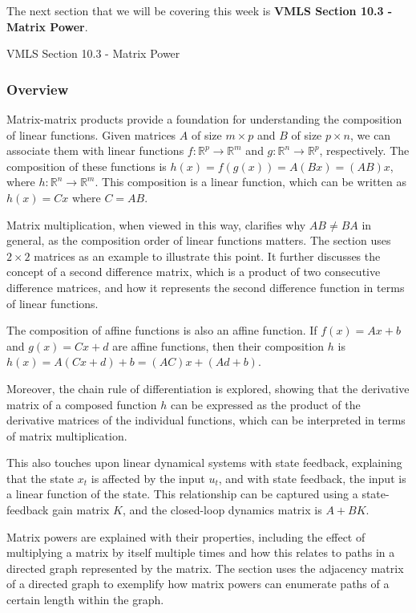 The next section that we will be covering this week is \textbf{VMLS Section 10.3 - Matrix Power}.

\begin{notes}{VMLS Section 10.3 - Matrix Power}
    \subsubsection*{Overview}

    Matrix-matrix products provide a foundation for understanding the composition of linear functions. Given matrices $A$ of size $m \times p$ and $B$ of size $p \times n$, we can associate them 
    with linear functions $f: \mathbb{R}^p \to \mathbb{R}^m$ and $g: \mathbb{R}^n \to \mathbb{R}^p$, respectively. The composition of these functions is $h(x) = f(g(x)) = A(Bx) = (AB)x$, where 
    $h: \mathbb{R}^n \to \mathbb{R}^m$. This composition is a linear function, which can be written as $h(x) = Cx$ where $C = AB$.
    
    Matrix multiplication, when viewed in this way, clarifies why $AB \neq BA$ in general, as the composition order of linear functions matters. The section uses $2 \times 2$ matrices as an example 
    to illustrate this point. It further discusses the concept of a second difference matrix, which is a product of two consecutive difference matrices, and how it represents the second difference 
    function in terms of linear functions.
    
    The composition of affine functions is also an affine function. If $f(x) = Ax + b$ and $g(x) = Cx + d$ are affine functions, then their composition $h$ is $h(x) = A(Cx + d) + b = (AC)x + (Ad + b)$.
    
    Moreover, the chain rule of differentiation is explored, showing that the derivative matrix of a composed function $h$ can be expressed as the product of the derivative matrices of the individual 
    functions, which can be interpreted in terms of matrix multiplication.
    
    This also touches upon linear dynamical systems with state feedback, explaining that the state $x_t$ is affected by the input $u_t$, and with state feedback, the input is a linear function 
    of the state. This relationship can be captured using a state-feedback gain matrix $K$, and the closed-loop dynamics matrix is $A + BK$.
    
    Matrix powers are explained with their properties, including the effect of multiplying a matrix by itself multiple times and how this relates to paths in a directed graph represented by the matrix. The 
    section uses the adjacency matrix of a directed graph to exemplify how matrix powers can enumerate paths of a certain length within the graph.
    

\end{notes}

